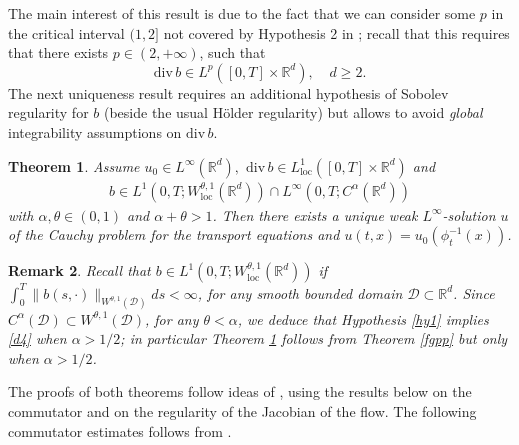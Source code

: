 \documentclass{article}
\newtheorem{theorem}{Theorem}
\newtheorem{remark}[theorem]{Remark}
\newcommand{\loc}{\mathrm{loc}}
\newcommand{\RR}{\mathbb{R}}
\begin{document}
The main interest of this result is due to the fact that  we can
consider some $p$ in the critical interval  $(1,2]$ not covered by
Hypothesis 2 in \cite{FGP}; recall that this  requires that  there
exists $p \in(2,+\infty)$, such that
\begin{equation}
{\mathrm{div}\,}b\in L^{p} ([0,T]\times\mathbb{R}^{d})\label{uni},
\;\;\;\ d \ge 2.
\end{equation}
The next uniqueness result  requires  an additional hypothesis of
Sobolev regularity for $b$ (beside the usual H\"older regularity)
but allows to   avoid    {\it global} integrability assumptions on
$\mathrm{div}\,b$.
\begin{theorem}
\label{thm:aux-2}
 Assume     $u_{0}\in
L^{\infty}\left( \mathbb{R}^{d}\right)  ,$    $\mathrm{div}\, b\in
L^1_\loc([0,T]\times\RR^d)$ and
\begin{align} \label{d4}
  b \in L^1 (0,T; W_{\loc}^{\theta, 1} (\RR^d) ) \cap L^\infty (0,T; C^{\alpha} (\RR^d) )
\end{align}
with $\alpha, \theta \in (0,1)$  and $\alpha+\theta>1$. Then
 there exists a unique weak $L^{\infty}$-solution $u$ of the
Cauchy problem for the transport equations and $
u(t,x)=u_{0}({\phi}_{t}^{-1}( x)) $.
\end{theorem}

  \begin{remark} Recall that
 $b \in L^1 (0,T; W_{\loc}^{\theta, 1} (\RR^d) )$ if  $\int_0^T \| b (s, \cdot)\|_{W_{}^{\theta, 1} (\mathcal{D})} ds < \infty$,
 for any smooth bounded domain $\mathcal{D} \subset \mathbb{R}^d$.
  Since  $C^{\alpha} (\mathcal{D}) \subset W_{}^{\theta, 1} (\mathcal{D}) $, for any $\theta < \alpha$, we deduce that Hypothesis \ref{hy1}  implies  \eqref{d4} when $\alpha > 1/2$; in particular Theorem \ref{thm:aux-2}  follows from  Theorem \ref{fgpp} but only when $\alpha >1/2$.
  \end{remark}



 The proofs of both theorems follow ideas of \cite[Section 5]{FGP},
 using the results below on the commutator and on the regularity of
the Jacobian of the flow.
 The following
commutator estimates follows from \cite[Lemma 22]{FGP}.
\end{document}
